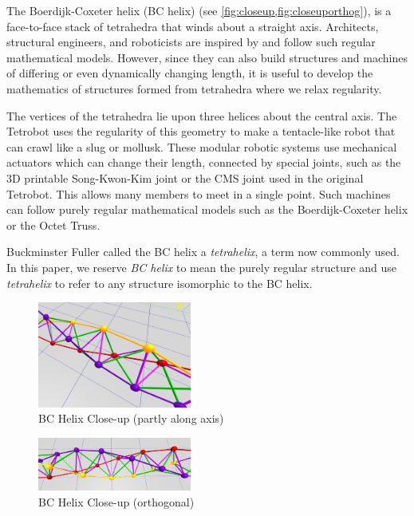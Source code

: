\documentclass[twocolumn,10pt]{asme2ej}
\begin{document}
The Boerdijk-Coxeter helix\cite{coxeter1985simplicial} (BC helix) (see \cref{fig:closeup,fig:closeuporthog}), is
a face-to-face stack of tetrahedra that winds about a straight axis.
Architects, structural engineers, and roboticists are inspired
by and follow such regular mathematical models.
However, since they can also build structures and
machines of differing or even dynamically changing length, it is
useful to develop the mathematics of structures formed from tetrahedra
where we relax regularity.


The vertices of the tetrahedra lie upon
three helices about the central axis.
The 
Tetrobot\cite{readglussbot,TetrobotBook} uses the regularity of
this geometry to make a tentacle-like robot that can crawl like a slug
or mollusk.  These modular robotic systems use mechanical actuators which can
change their length, connected by special joints,
such as the 3D printable Song-Kwon-Kim\cite{song2003spherical} joint or the CMS joint\cite{HamlinSandersonCMS}
used in the original Tetrobot.
This allows many members to meet in a single point.
Such machines can
follow purely regular mathematical models such as the Boerdijk-Coxeter
helix or the Octet Truss\cite{richard1961synergetic}.

Buckminster Fuller called the BC helix a \emph{tetrahelix}\cite{fuller1982synergetics},
a term now commonly used. In this paper, we reserve \emph{BC helix} to mean the purely regular structure and use \emph{tetrahelix} to refer
to any structure isomorphic to the BC helix.

\begin{figure}
  \centering
     \includegraphics[width=0.45\textwidth]{figures/BCHelixCloseUp.png}
     \caption{BC Helix Close-up (partly along axis)}
  \label{fig:closeup}     
\end{figure}
\begin{figure}
  \centering
     \includegraphics[width=0.45\textwidth]{figures/VerticalCloseUp.png}
     \caption{BC Helix Close-up (orthogonal)}
  \label{fig:closeuporthog}
\end{figure}
\end{document}

